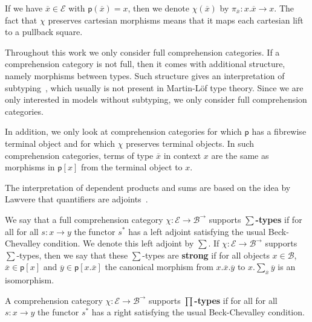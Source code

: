 \documentclass[a4paper,UKenglish,cleveref,numberwithinsect, autoref, thm-restate]{lipics-v2021}
\newcommand{\Base}{\mathcal{B}}
\newcommand{\Total}{\mathcal{E}}
\newcommand{\fib}{\mathsf{p}}
\newcommand{\comp}{\chi}
\newcommand{\Arrow}[1]{#1^{\rightarrow}}
\newcommand{\proj}[1]{\pi_{#1}}
\newcommand{\CtxExt}[2]{#1 . #2}
\newcommand{\subst}[1]{#1^*}
\newcommand{\fiber}[2]{#1[#2]}
\newcommand{\disp}[1]{\overline{#1}}
\newcommand{\xx}{\disp{x}}
\newcommand{\yy}{\disp{y}}
\begin{document}
If we have $\xx \in \Total$ with $\fib(\xx) = x$,
then we denote $\comp(\xx)$ by $\proj{\xx} : \CtxExt{x}{\xx} \rightarrow x$.
The fact that $\comp$ preserves cartesian morphisms
means that it maps each cartesian lift to a pullback square.

\begin{remark}
Throughout this work we only consider full comprehension categories.
If a comprehension category is not full,
then it comes with additional structure,
namely morphisms between types.
Such structure gives an interpretation of subtyping~\cite{coraglia:2024a,najmaei:2026},
which usually is not present in Martin-L\"of type theory.
Since we are only interested in models without subtyping,
we only consider full comprehension categories.

In addition,
we only look at comprehension categories for which $\fib$ has a fibrewise terminal object
and for which $\comp$ preserves terminal objects.
In such comprehension categories,
terms of type $\xx$ in context $x$ are the same as
morphisms in $\fiber{\fib}{x}$ from the terminal object to $x$.
\end{remark}

The interpretation of dependent products and sums are based on the idea by Lawvere
that quantifiers are adjoints~\cite{jacobs:2001,lawvere:2006}.

\begin{definition}
\label{def:quantifiers}
We say that a full comprehension category $\comp : \Total \rightarrow \Arrow{\Base}$ supports \textbf{$\sum$-types}
if for all for all $s : x \rightarrow y$ the functor $\subst{s}$ has a left adjoint
satisfying the usual Beck-Chevalley condition.
We denote this left adjoint by $\sum$.
If $\comp : \Total \rightarrow \Arrow{\Base}$ supports $\sum$-types,
then we say that these $\sum$-types are \textbf{strong}
if for all objects $x \in \Base$, $\xx \in \fiber{\fib}{x}$ and $\yy \in \fiber{\fib}{\CtxExt{x}{\xx}}$
the canonical morphism from $\CtxExt{\CtxExt{x}{\xx}}{\yy}$ to $\CtxExt{x}{\sum_{\xx} \yy}$ is an isomorphism.

A comprehension category $\comp : \Total \rightarrow \Arrow{\Base}$ supports \textbf{$\prod$-types}
if for all for all $s : x \rightarrow y$ the functor $\subst{s}$ has a right satisfying the usual Beck-Chevalley condition.
\end{definition}
\end{document}

